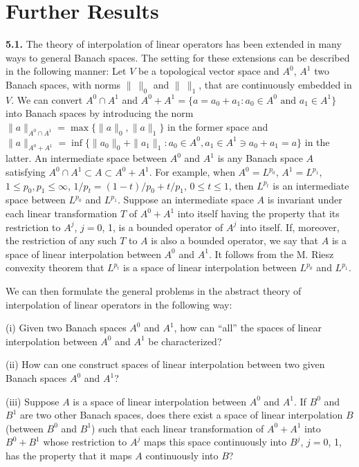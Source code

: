 \section{Further Results}

\textbf{5.1.} The theory of interpolation of linear operators has been
extended in many ways to general Banach spaces. The setting for these
extensions can be described in the following manner: Let $V$ be a topological
vector space and $A^{0}$, $A^{1}$ two Banach spaces, with norms $\|\ \|_{0}$
and $\|\ \|_{1}$, that are continuously embedded in $V$. We can convert
$A^{0} \cap A^{1}$ and
$A^{0} + A^{1} = \{a = a_{0} + a_{1} : a_{0} \in A^{0} \text{ and } a_{1} \in A^{1}\}$
into Banach spaces by introducing the norm
$\|a\|_{A^{0} \cap A^{1}} = \max\{\|a\|_{0}, \|a\|_{1}\}$ in the former space
and
$\|a\|_{A^{0} + A^{1}} = \inf\{\|a_{0}\|_{0} + \|a_{1}\|_{1} : a_{0} \in A^{0}, a_{1} \in A^{1} \ni a_{0} + a_{1} = a\}$
in the latter. An intermediate space between $A^{0}$ and $A^{1}$ is any Banach
space $A$ satisfying $A^{0} \cap A^{1} \subset A \subset A^{0} + A^{1}$. For
example, when $A^{0} = L^{p_{0}}$, $A^{1} = L^{p_{1}}$,
$1 \leq p_{0}, p_{1} \leq \infty$,
$1/p_{t} = (1 - t)/p_{0} + t/p_{1}$, $0 \leq t \leq 1$, then $L^{p_{t}}$ is an
intermediate space between $L^{p_{0}}$ and $L^{p_{1}}$. Suppose an intermediate
space $A$ is invariant under each linear transformation $T$ of $A^{0} + A^{1}$
into itself having the property that its restriction to $A^{j}$, $j = 0$, 1, is
a bounded operator of $A^{j}$ into itself. If, moreover, the restriction of any
such $T$ to $A$ is also a bounded operator, we say that $A$ is a space of
linear interpolation between $A^{0}$ and $A^{1}$. It follows from the M. Riesz
convexity theorem that $L^{p_{t}}$ is a space of linear interpolation between
$L^{p_{0}}$ and $L^{p_{1}}$.

We can then formulate the general problems in the abstract theory of
interpolation of linear operators in the following way:

\textup{(i)} Given two Banach spaces $A^{0}$ and $A^{1}$, how can ``all'' the
spaces of linear interpolation between $A^{0}$ and $A^{1}$ be characterized?

\textup{(ii)} How can one construct spaces of linear interpolation between two
given Banach spaces $A^{0}$ and $A^{1}$?

\textup{(iii)} Suppose $A$ is a space of linear interpolation between $A^{0}$
and $A^{1}$. If $B^{0}$ and $B^{1}$ are two other Banach spaces, does there
exist a space of linear interpolation $B$ (between $B^{0}$ and $B^{1}$) such
that each linear transformation of $A^{0} + A^{1}$ into $B^{0} + B^{1}$ whose
restriction to $A^{j}$ maps this space continuously into $B^{j}$, $j = 0$, 1,
has the property that it maps $A$ continuously into $B$?

